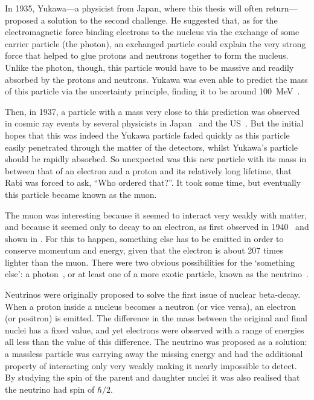 In 1935, Yukawa---a physicist from Japan, where this thesis will often return---proposed a solution to the second challenge.
He suggested that, as for the electromagnetic force binding electrons to the nucleus via the exchange of some carrier particle (the photon), 
an exchanged particle could explain the very strong force that helped to glue protons and neutrons together to form the nucleus.
Unlike the photon, though, this particle would have to be massive and readily absorbed by the protons and neutrons.
Yukawa was even able to predict the mass of this particle via the uncertainty principle, finding it to be around 100~MeV~\cite{Yukawa:1935xg}.

\FigTheoryMuonDecayCloudChamber
Then, in 1937, a particle with a mass very close to this prediction was observed in cosmic ray events by several physicists in Japan~\cite{Nishina193712} and the US~\cite{Neddermeyer1937md,Street193711}.
But the initial hopes that this was indeed the Yukawa particle faded quickly as this particle easily penetrated through the matter of the detectors, whilst Yukawa's particle should be rapidly absorbed.
So unexpected was this new particle with its mass in between that of an electron and a proton and its relatively long lifetime, that Rabi was forced to ask, ``Who ordered that?''.
It took some time, but eventually this particle became known as the muon.

The muon was interesting because it seemed to interact very weakly with matter, and because it seemed only to decay to an electron, as first observed in 1940~\cite{MuNeutrinoDiscovery} and shown in .
For this to happen, something else has to be emitted in order to conserve momentum and energy, given that the electron is about 207 times lighter than the muon.
There were two obvious possibilities for the `something else': a photon~\cite{}, or at least one of a more exotic particle, known as the neutrino~\cite{}.

Neutrinos were originally proposed to solve the first issue of nuclear beta-decay.
When a proton inside a nucleus becomes a neutron (or vice versa), an electron (or positron) is emitted.
The difference in the mass between the original and final nuclei has a fixed value, and yet electrons were observed with a range of energies all less than the value of this difference.
The neutrino was proposed as a solution: a massless particle was carrying away the missing energy and had the additional property of interacting only very weakly making it nearly impossible to detect.
By studying the spin of the parent and daughter nuclei it was also realised that the neutrino had spin of $\hbar/2$.

